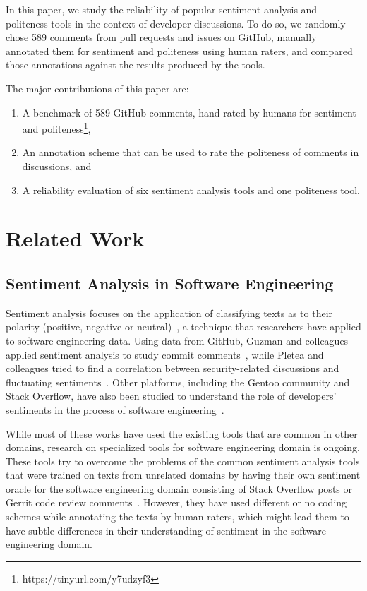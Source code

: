In this paper, we study the reliability of popular sentiment analysis 
and politeness tools in the context of developer discussions.
To do so, we randomly chose 589 comments from pull requests and issues on GitHub,
manually annotated them for sentiment and politeness using human raters,
and compared those annotations against the results produced by the tools. 
 


The major contributions of this paper are:
\begin{enumerate}
    \item A benchmark of 589 GitHub comments, 
    hand-rated by humans for sentiment and politeness\footnote{https://tinyurl.com/y7udzyf3}, 
    \item An annotation scheme that can be used to rate 
    the politeness of comments in discussions, and
    \item A reliability evaluation of six sentiment analysis 
    tools and one politeness tool.
\end{enumerate}




\section{Related Work}\label{relwork}
\subsection{Sentiment Analysis in Software Engineering}\label{rwsent}

Sentiment analysis focuses on the application of classifying texts as to their polarity (positive, negative or neutral)~\cite{pang2008opinion}, a technique that researchers have applied to software engineering data. Using data from GitHub, Guzman and colleagues applied sentiment analysis to study commit comments~\cite{guzman2014sentiment}, while Pletea and colleagues tried to find a correlation between security-related discussions and fluctuating sentiments~\cite{pletea2014security}. Other platforms, including the Gentoo community and Stack Overflow, have also been studied to understand the role of developers' sentiments in the process of software engineering~\cite{garcia2013role,islam2016towards,guzman2013towards,novielli2014towards}.

While most of these works have used the existing tools that are common in other domains, research on specialized tools for software engineering domain is ongoing. These tools try to overcome the problems of the common sentiment analysis tools that were trained on texts from unrelated domains by having their own sentiment oracle for the software engineering domain consisting of Stack Overflow posts or Gerrit code review comments~\cite{ahmed2017senticr,calefato2017sentiment}. However, they have used different or no coding schemes while annotating the texts by human raters, which might lead them to have subtle differences in their understanding of sentiment in the software engineering domain.

